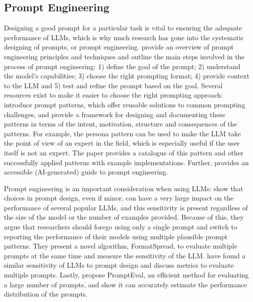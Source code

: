 \documentclass[a4paper]{article}
\begin{document}
\subsection{Prompt Engineering} \label{Prompt Engineering}
Designing a good prompt for a particular task is vital to ensuring the adequate performance of LLMs, which is why much research has gone into the systematic designing of prompts, or prompt engineering. \textcite{Marvin2024} provide an overview of prompt engineering principles and techniques and outline the main steps involved in the process of prompt engineering: 1) define the goal of the prompt; 2) understand the model's capabilities; 3) choose the right prompting format; 4) provide context to the LLM and 5) test and refine the prompt based on the goal. Several resources exist to make it easier to choose the right prompting approach: \textcite{white2023} introduce prompt patterns, which offer reusable solutions to common prompting challenges, and provide a framework for designing and documenting these patterns in terms of the intent, motivation, structure and consequences of the patterns. For example, the persona pattern can be used to make the LLM take the point of view of an expert in the field, which is especially useful if the user itself is not an expert. The paper provides a catalogue of this pattern and other successfully applied patterns with example implementations. Further, \textcite{ekin2023} provides an accessible (AI-generated) guide to prompt engineering.

Prompt engineering is an important consideration when using LLMs: \textcite{sclar2024quantifyinglanguagemodelssensitivity} show that choices in prompt design, even if minor, can have a very large impact on the performance of several popular LLMs, and this sensitivity is present regardless of the size of the model or the number of examples provided. Because of this, they argue that researchers should forego using only a single prompt and switch to reporting the performance of their models using multiple plausible prompt patterns. They present a novel algorithm, FormatSpread, to evaluate multiple prompts at the same time and measure the sensitivity of the LLM. \textcite{mizrahi2024stateartmultipromptllm} have found a similar sensitivity of LLMs to prompt design and discuss metrics to evaluate multiple prompts. Lastly, \textcite{polo2024multiprompt} propose PromptEval, an efficient method for evaluating a large number of prompts, and show it can accurately estimate the performance distribution of the prompts. 
\end{document}
